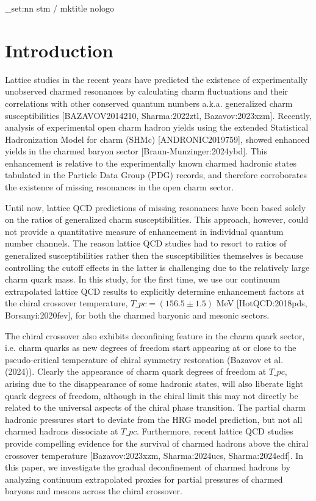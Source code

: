 \documentclass[11pt,a4paper]{article}
\begin{document}
\_set:nn stm / mktitle nologo

\section{Introduction}

Lattice studies in the recent years have predicted the existence of experimentally unobserved charmed resonances by calculating charm fluctuations and their correlations with other conserved quantum numbers a.k.a. generalized charm susceptibilities [BAZAVOV2014210, Sharma:2022ztl, Bazavov:2023xzm]. Recently, analysis of experimental  open charm hadron yields using the extended Statistical Hadronization Model for charm (SHMc) [ANDRONIC2019759], showed enhanced yields in the charmed baryon sector [Braun-Munzinger:2024ybd]. This enhancement is relative to the experimentally known charmed hadronic states tabulated in the Particle Data Group (PDG) records, and  therefore corroborates the existence of missing resonances in the open charm sector.

Until now, lattice QCD predictions of missing resonances have been based solely on the ratios of generalized charm susceptibilities. This approach, however, could not provide a quantitative measure of enhancement in individual quantum number channels. The reason lattice QCD studies had to resort to ratios of generalized susceptibilities rather then the susceptibilities themselves is because
controlling the cutoff effects in the latter is challenging due to the relatively large charm quark mass.  In this study, for the first time, we use our continuum extrapolated lattice QCD results to explicitly determine enhancement factors at the chiral crossover temperature, ${T\_{pc}=(156.5\pm1.5)}$ MeV [HotQCD:2018pds, Borsanyi:2020fev], for both the charmed baryonic and mesonic sectors.

The chiral crossover also exhibits deconfining feature in the charm quark sector, i.e. charm quarks as new degrees of freedom start appearing at or close to the pseudo-critical temperature of chiral symmetry restoration (Bazavov et al. (2024)). Clearly the appearance of charm quark degrees of freedom at $T\_{pc}$, arising due to the disappearance of some hadronic states, will also liberate light quark degrees of freedom, although in the chiral limit this may not directly be related to the universal aspects of the chiral phase transition. The partial charm hadronic pressures start to deviate from the HRG model prediction, but not all charmed
hadrons dissociate at $T\_{pc}$. Furthermore, recent lattice QCD studies provide compelling evidence for the survival of charmed hadrons above the chiral crossover temperature [Bazavov:2023xzm, Sharma:2024ucs, Sharma:2024edf]. In this paper, we investigate the gradual deconfinement of charmed hadrons by analyzing continuum extrapolated proxies for partial pressures of charmed baryons and mesons across the chiral crossover.
\end{document}
